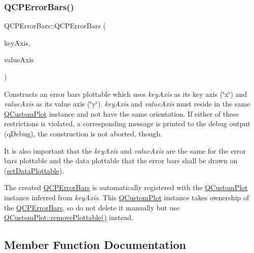 \subsubsection{\texorpdfstring{Q\+C\+P\+Error\+Bars()}{QCPErrorBars()}}
{\footnotesize\ttfamily Q\+C\+P\+Error\+Bars\+::\+Q\+C\+P\+Error\+Bars (\begin{DoxyParamCaption}\item[{\hyperlink{class_q_c_p_axis}{Q\+C\+P\+Axis} $\ast$}]{key\+Axis,  }\item[{\hyperlink{class_q_c_p_axis}{Q\+C\+P\+Axis} $\ast$}]{value\+Axis }\end{DoxyParamCaption})\hspace{0.3cm}{\ttfamily [explicit]}}

Constructs an error bars plottable which uses {\itshape key\+Axis} as its key axis (\char`\"{}x\char`\"{}) and {\itshape value\+Axis} as its value axis (\char`\"{}y\char`\"{}). {\itshape key\+Axis} and {\itshape value\+Axis} must reside in the same \hyperlink{class_q_custom_plot}{Q\+Custom\+Plot} instance and not have the same orientation. If either of these restrictions is violated, a corresponding message is printed to the debug output (q\+Debug), the construction is not aborted, though.

It is also important that the {\itshape key\+Axis} and {\itshape value\+Axis} are the same for the error bars plottable and the data plottable that the error bars shall be drawn on (\hyperlink{class_q_c_p_error_bars_aabb42a964cfbf780cd1c79850c7cd989}{set\+Data\+Plottable}).

The created \hyperlink{class_q_c_p_error_bars}{Q\+C\+P\+Error\+Bars} is automatically registered with the \hyperlink{class_q_custom_plot}{Q\+Custom\+Plot} instance inferred from {\itshape key\+Axis}. This \hyperlink{class_q_custom_plot}{Q\+Custom\+Plot} instance takes ownership of the \hyperlink{class_q_c_p_error_bars}{Q\+C\+P\+Error\+Bars}, so do not delete it manually but use \hyperlink{class_q_custom_plot_af3dafd56884208474f311d6226513ab2}{Q\+Custom\+Plot\+::remove\+Plottable()} instead. 

\subsection{Member Function Documentation}
\mbox{\label{class_q_c_p_error_bars_aae296ad9817b3fa418db284af81cecf8}} 
